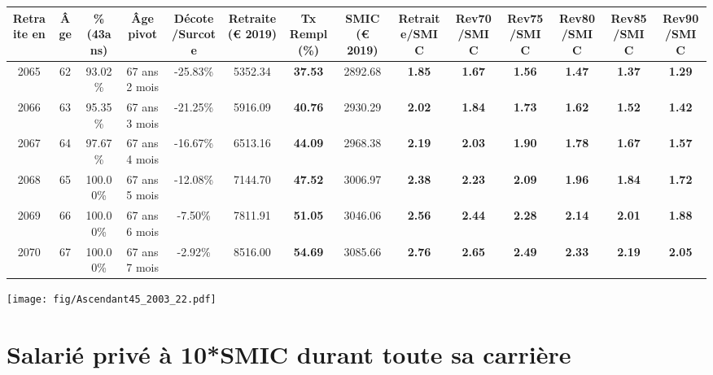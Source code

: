 \begin{adjustbox}{max width=\textwidth} 
\begin{tabular}[htb]{|c|c||c|c|c||c|c||c||c|c|c|c|c|c|} 
\hline 
 Retraite en &  Âge &  \%(43ans) &  Âge pivot &  Décote/Surcote &  Retraite (\euro{} 2019) &  Tx Rempl(\%) &  SMIC (\euro{} 2019) &  Retraite/SMIC &  Rev70/SMIC &  Rev75/SMIC &  Rev80/SMIC &  Rev85/SMIC &  Rev90/SMIC \\ 
\hline \hline 
 2065 &  62 &  93.02\% &  67 ans 2 mois &  -25.83\% &  5352.34 &  {\bf 37.53} &  2892.68 &  {\bf 1.85} &  {\bf 1.67} &  {\bf 1.56} &  {\bf 1.47} &  {\bf 1.37} &  {\bf 1.29} \\ 
\hline 
 2066 &  63 &  95.35\% &  67 ans 3 mois &  -21.25\% &  5916.09 &  {\bf 40.76} &  2930.29 &  {\bf 2.02} &  {\bf 1.84} &  {\bf 1.73} &  {\bf 1.62} &  {\bf 1.52} &  {\bf 1.42} \\ 
\hline 
 2067 &  64 &  97.67\% &  67 ans 4 mois &  -16.67\% &  6513.16 &  {\bf 44.09} &  2968.38 &  {\bf 2.19} &  {\bf 2.03} &  {\bf 1.90} &  {\bf 1.78} &  {\bf 1.67} &  {\bf 1.57} \\ 
\hline 
 2068 &  65 &  100.00\% &  67 ans 5 mois &  -12.08\% &  7144.70 &  {\bf 47.52} &  3006.97 &  {\bf 2.38} &  {\bf 2.23} &  {\bf 2.09} &  {\bf 1.96} &  {\bf 1.84} &  {\bf 1.72} \\ 
\hline 
 2069 &  66 &  100.00\% &  67 ans 6 mois &  -7.50\% &  7811.91 &  {\bf 51.05} &  3046.06 &  {\bf 2.56} &  {\bf 2.44} &  {\bf 2.28} &  {\bf 2.14} &  {\bf 2.01} &  {\bf 1.88} \\ 
\hline 
 2070 &  67 &  100.00\% &  67 ans 7 mois &  -2.92\% &  8516.00 &  {\bf 54.69} &  3085.66 &  {\bf 2.76} &  {\bf 2.65} &  {\bf 2.49} &  {\bf 2.33} &  {\bf 2.19} &  {\bf 2.05} \\ 
\hline 
\hline 
\end{tabular} 
\end{adjustbox} 
 
 \vspace{0.1cm} 

 \begin{center}\texttt{[image: fig/Ascendant45\_2003\_22.pdf]}\end{center} \label{fig/Ascendant45_2003_22.pdf} 

\newpage 
 
\chapter{Salarié privé à 10*SMIC durant toute sa carrière} 


